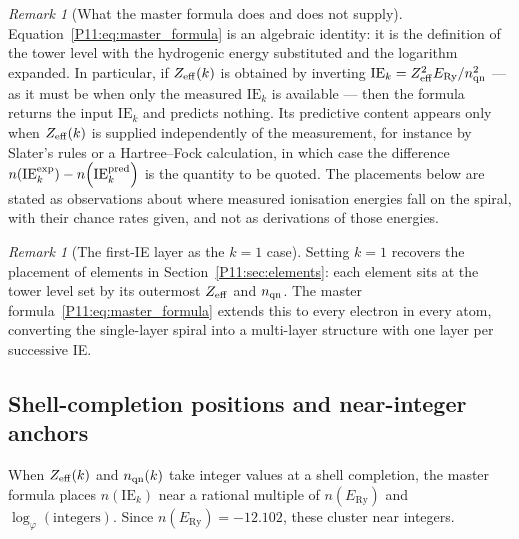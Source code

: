 \documentclass[11pt,a4paper]{article}
\theoremstyle{definition}
\theoremstyle{remark}
\newtheorem{remark}[theorem]{Remark}
\newcommand{\vp}{\varphi}
\newcommand{\ERy}{E_{\mathrm{Ry}}}
\newcommand{\nlvl}[1]{n\!\left(#1\right)}
\newcommand{\IE}{\mathrm{IE}}
\begin{document}
\begin{remark}[What the master formula does and does not supply]
\label{P11:rem:master_scope}
Equation~\eqref{P11:eq:master_formula} is an algebraic identity: it
is the definition of the tower level with the hydrogenic energy
substituted and the logarithm expanded.  In particular, if
$Z_{\rm eff}(k)$ is obtained by inverting
$\IE_k=Z_{\rm eff}^2\ERy/n_{\rm qn}^2$ --- as it must be when only
the measured $\IE_k$ is available --- then the formula returns the
input $\IE_k$ and predicts nothing.  Its predictive content appears
only when $Z_{\rm eff}(k)$ is supplied independently of the
measurement, for instance by Slater's rules or a Hartree--Fock
calculation, in which case the difference
$\nlvl{\IE_k^{\rm exp}}-\nlvl{\IE_k^{\rm pred}}$ is the quantity
to be quoted.  The placements below are stated as observations about
where measured ionisation energies fall on the spiral, with their
chance rates given, and not as derivations of those energies.
\end{remark}

\begin{remark}[The first-IE layer as the $k=1$ case]
\label{P11:rem:first_IE_special}
Setting $k=1$ recovers the placement of elements in
Section~\ref{P11:sec:elements}: each element sits at the tower level
set by its outermost $Z_{\rm eff}$ and $n_{\rm qn}$.
The master formula~\eqref{P11:eq:master_formula} extends this to
every electron in every atom, converting the single-layer spiral into
a multi-layer structure with one layer per successive IE.
\end{remark}

\subsection{Shell-completion positions and near-integer anchors}
\label{P11:subsec:shell_completion}

When $Z_{\rm eff}(k)$ and $n_{\rm qn}(k)$ take integer values at a
shell completion, the master formula places $\nlvl{\IE_k}$ near a
rational multiple of $\nlvl{\ERy}$ and $\log_\vp(\text{integers})$.
Since $\nlvl{\ERy}=-12.102$, these cluster near integers.
\end{document}
